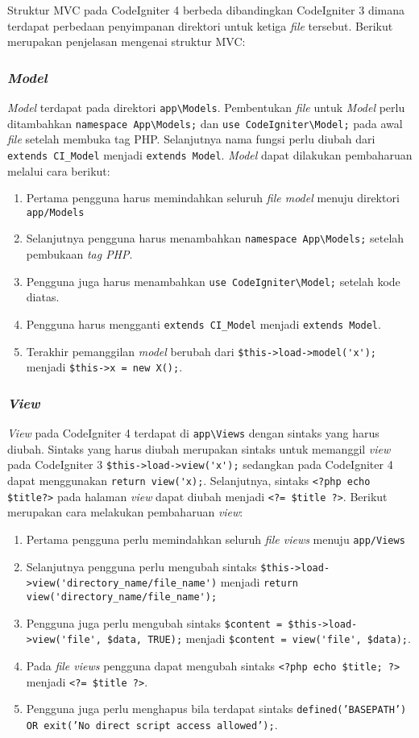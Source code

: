 Struktur MVC pada CodeIgniter 4 berbeda dibandingkan CodeIgniter 3 dimana terdapat perbedaan penyimpanan direktori untuk ketiga \textit{file} tersebut. Berikut merupakan penjelasan mengenai struktur MVC:

\subsubsection{\textit{Model}}
\textit{Model} terdapat pada direktori \verb|app\Models|. Pembentukan \textit{file} untuk \textit{Model} perlu ditambahkan \verb|namespace App\Models;| dan \verb|use CodeIgniter\Model;| pada awal \textit{file} setelah membuka tag PHP. Selanjutnya nama fungsi perlu diubah dari \verb|extends CI_Model| menjadi \verb|extends Model|. \textit{Model} dapat dilakukan pembaharuan melalui cara berikut:
\begin{enumerate}
\item Pertama pengguna harus memindahkan seluruh \textit{file model} menuju direktori \verb|app/Models|
\item Selanjutnya pengguna harus menambahkan \verb|namespace App\Models;| setelah pembukaan \textit{tag PHP}.
\item Pengguna juga harus menambahkan \verb|use CodeIgniter\Model;| setelah kode diatas.
\item Pengguna harus mengganti \verb|extends CI_Model| menjadi \verb|extends Model|.
\item Terakhir pemanggilan \textit{model} berubah dari \verb|$this->load->model('x');| menjadi \verb|$this->x = new X();|.
\end{enumerate}
 
\subsubsection{\textit{View}}
\textit{View} pada CodeIgniter 4 terdapat di \verb|app\Views| dengan sintaks yang harus diubah. Sintaks yang harus diubah merupakan sintaks untuk memanggil \textit{view} pada CodeIgniter 3 \verb|$this->load->view('x');| sedangkan pada CodeIgniter 4 dapat menggunakan \verb|return view('x);|. Selanjutnya, sintaks \verb|<?php echo $title?>| pada halaman \textit{view} dapat diubah menjadi
 \verb|<?= $title ?>|. Berikut merupakan cara melakukan pembaharuan \textit{view}:
\begin{enumerate}
\item Pertama pengguna perlu memindahkan seluruh \textit{file views} menuju \verb|app/Views|
\item Selanjutnya pengguna perlu mengubah sintaks \verb|$this->load->view('directory_name/file_name')| menjadi \verb|return view('directory_name/file_name');|
\item Pengguna juga perlu mengubah sintaks \verb|$content = $this->load->view('file', $data, TRUE);| menjadi \verb|$content = view('file', $data);|.
\item Pada \textit{file views} pengguna dapat mengubah sintaks \verb|<?php echo $title; ?>| menjadi \verb|<?= $title ?>|.
\item Pengguna juga perlu menghapus bila terdapat sintaks \texttt{defined('BASEPATH') OR exit('No direct script access allowed');}.
\end{enumerate}
 

